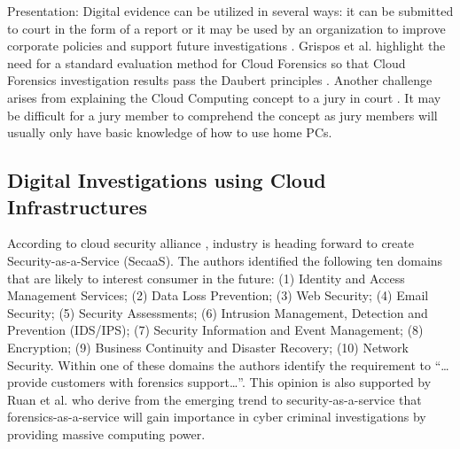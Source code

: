 \documentclass[runningheads,a4paper]{llncs}
\begin{document}
Presentation: Digital evidence can be utilized in several ways: it can be submitted to court in the form of a report \cite{Carrier2003} or it may be used by an organization to improve corporate policies and support future investigations \cite{Wang2005}. Grispos et al. \cite{Grispos2011} highlight the need for a standard evaluation method for Cloud Forensics so that Cloud Forensics investigation results pass the Daubert principles \cite{Marsico2005}. Another challenge arises from explaining the Cloud Computing concept to a jury in court \cite{Reilly2010}. It may be difficult for a jury member to comprehend the concept as jury members will usually only have basic knowledge of how to use home PCs. 

\subsection{Digital Investigations using Cloud Infrastructures}

According to cloud security alliance \cite{CSA2011}, industry is heading forward to create Security-as-a-Service (SecaaS). The authors identified the following ten domains that are likely to interest consumer in the future: (1) Identity and Access Management Services; (2) Data Loss Prevention; (3) Web Security; (4) Email Security; (5) Security Assessments; (6) Intrusion Management, Detection and Prevention (IDS/IPS); (7) Security Information and Event Management; (8) Encryption; (9) Business Continuity and Disaster Recovery; (10) Network Security. Within one of these domains the authors identify the requirement to ``\ldots provide customers with forensics support\ldots''. This opinion is also supported by Ruan et al. \cite{Ruan2011} who derive from the emerging trend to security-as-a-service that forensics-as-a-service will gain importance in cyber criminal investigations by providing massive computing power.
\end{document}
